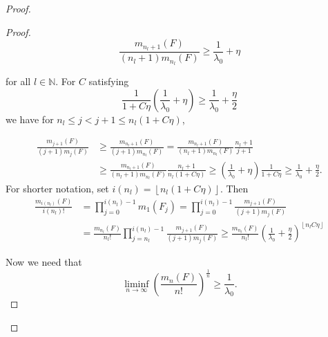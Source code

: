 \documentclass[12pt,a4paper]{scrartcl}
\numberwithin{equation}{section}
\newcommand{\N}{\mathbb{N}} %
\begin{document}
\begin{proof}
\begin{proof}
\begin{equation}\label{eq:forlateruse}
\frac{m_{n_l+1}\left(F\right)}{\left(n_l+1\right) m_{n_l}\left(F\right)} \geq \frac{1}{\lambda_0} + \eta
\end{equation}

for all $ l \in \N $. For $C$ satisfying
$$ \frac{1}{1+C\eta}\left(\frac{1}{\lambda_0}+\eta\right) \geq \frac{1}{\lambda_0} + \frac{\eta}{2} $$
we have for $n_l \leq j < j+1 \leq n_l\left(1+C\eta\right)$,

\begin{align*}
\frac{m_{j+1}\left(F\right)}{\left(j+1\right) m_j\left(F\right)} &\geq \frac{m_{n_l+1}\left(F\right)}{\left(j+1\right) m_{n_l}\left(F\right)} = \frac{m_{n_l+1}\left(F\right)}{\left(n_l+1\right) m_{n_l}\left(F\right)} \frac{n_l+1}{j+1} \\
&\geq \frac{m_{n_l+1}\left(F\right)}{\left(n_l+1\right) m_{n_l}\left(F\right)} \frac{n_l+1}{n_l\left(1+C\eta\right)} \geq \left(\frac{1}{\lambda_0}+\eta\right) \frac{1}{1+C\eta} \geq \frac{1}{\lambda_0} + \frac{\eta}{2}.
\end{align*} 
For shorter notation, set $i\left(n_l\right) = \left\lfloor n_l\left(1+C\eta\right)\right\rfloor$. Then
\begin{align*}
\frac{m_{i\left(n_l\right)}\left(F\right)}{i\left(n_l\right)!} &= \prod_{j=0}^{i\left(n_l\right)-1} m_1\left(F_j\right) = \prod_{j=0}^{i\left(n_l\right)-1} \frac{m_{j+1}\left(F\right)}{\left(j+1\right) m_j\left(F\right)} \\
&= \frac{m_{n_l}\left(F\right)}{n_l!} \prod_{j=n_l}^{i\left(n_l\right)-1} \frac{m_{j+1}\left(F\right)}{\left(j+1\right) m_j\left(F\right)} \geq \frac{m_{n_l}\left(F\right)}{n_l!} \left(\frac{1}{\lambda_0} + \frac{\eta}{2}\right)^{\left\lfloor n_lC\eta \right\rfloor}
\end{align*}

Now we need that
\begin{equation}
\liminf_{n \to \infty} \left(\frac{m_n\left(F\right)}{n!}\right)^{\frac{1}{n}} \geq \frac{1}{\lambda_0}.
\end{equation} 


\end{proof}
\end{proof}
\end{document}
